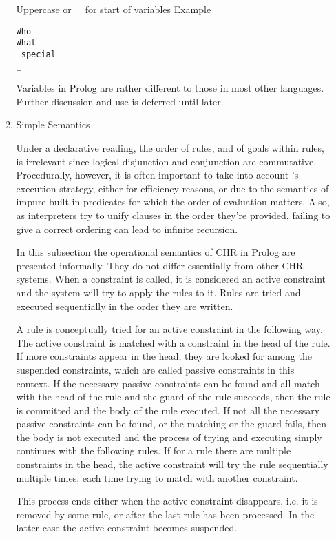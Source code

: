 \documentclass[thesis-solanki.tex]{subfiles}
\begin{document}
\begin{enumerate}
\begin{enumerate}
Uppercase or \_ for start of variables
Example
\par
\begin{verbatim}
Who
What
_special
_
\end{verbatim}
     
Variables in Prolog are rather different to those in most other languages. Further discussion and use is deferred until later.




\item Simple Semantics

Under a declarative reading, the order of rules, and of goals within rules, is irrelevant since logical disjunction and conjunction are 
commutative.
Procedurally, however, it is often important to take into account 's execution strategy, either
for efficiency reasons, or due to the semantics of impure built-in predicates for which the order of evaluation
matters.
Also, as  interpreters try to unify clauses in the order they're provided, failing to give a
correct ordering can lead to infinite recursion.


In this subsection the operational semantics of CHR in Prolog are presented informally. They do not differ essentially from other CHR systems.
When a constraint is called, it is considered an active constraint and the system will try to apply the rules to it. Rules are tried and executed sequentially in the order they are written.

\cite{website:swiprologsyntaxandsemantics}

A rule is conceptually tried for an active constraint in the following way. The active constraint is matched with a constraint in the head of the rule. If more constraints appear in the head, they are looked for among the suspended constraints, which are called passive constraints in this context. If the necessary passive constraints can be found and all match with the head of the rule and the guard of the rule succeeds, then the rule is committed and the body of the rule executed. If not all the necessary passive constraints can be found, or the matching or the guard fails, then the body is not executed and the process of trying and executing simply continues with the following rules. If for a rule there are multiple constraints in the head, the active constraint will try the rule sequentially multiple times, each time trying to match with another constraint.

This process ends either when the active constraint disappears, i.e. it is removed by some rule, or after the last rule has been processed. In the latter case the active constraint becomes suspended.


\end{enumerate}
\end{enumerate}
\end{document}
